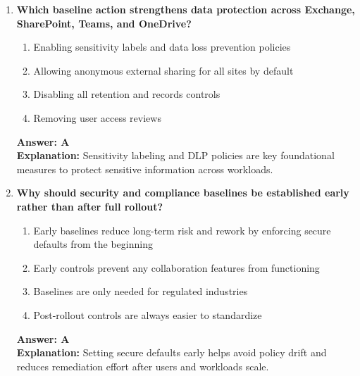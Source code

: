 \documentclass[10pt]{article}
\begin{document}
\begin{enumerate}[leftmargin=*]
\item \textbf{Which baseline action strengthens data protection across Exchange, SharePoint, Teams, and One\-Drive?}
\begin{enumerate}[label=\Alph*.]
  \item Enabling sensitivity labels and data loss prevention policies
  \item Allowing anonymous external sharing for all sites by default
  \item Disabling all retention and records controls
  \item Removing user access reviews
\end{enumerate}
\textbf{Answer: A}\\
\textbf{Explanation:} Sensitivity labeling and DLP policies are key foundational measures to protect sensitive information across workloads.

\item \textbf{Why should security and compliance baselines be established early rather than after full rollout?}
\begin{enumerate}[label=\Alph*.]
  \item Early baselines reduce long-term risk and rework by enforcing secure defaults from the beginning
  \item Early controls prevent any collaboration features from functioning
  \item Baselines are only needed for regulated industries
  \item Post-rollout controls are always easier to standardize
\end{enumerate}
\textbf{Answer: A}\\
\textbf{Explanation:} Setting secure defaults early helps avoid policy drift and reduces remediation effort after users and workloads scale.

\end{enumerate}
\clearpage
\end{document}

